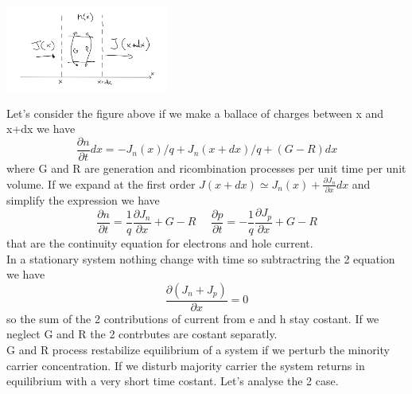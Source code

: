 \centering
\includegraphics[width=0.4\textwidth]{continuityeq.png}\\
\raggedright

Let's consider the figure above if we make a ballace of charges between x and x+dx we have 
\begin{equation}
\frac{\partial n}{\partial t}dx=-J_n(x)/q+J_n(x+dx)/q+(G-R)dx
\end{equation}
where G and R are generation and ricombination processes per unit time per unit volume. If we expand at the first order $J(x+dx)\simeq J_n(x)+\frac{\partial J_n}{\partial x}dx $ and simplify the expression we have
\begin{equation}
\frac{\partial n}{\partial t}=\frac{1}{q}\frac{\partial J_n}{\partial x}+G-R \ \ \ \ \ \ \frac{\partial p}{\partial t}=-\frac{1}{q}\frac{\partial J_p}{\partial x}+G-R
\end{equation}
that are the continuity equation for electrons and hole current.\\
In a stationary system nothing change with time so subtractring the 2 equation we have 
\begin{equation}
\frac{\partial(J_n+J_p)}{\partial x}=0
\end{equation}
so the sum of the 2 contributions of current from e and h stay costant. If we neglect G and R the 2 contrbutes are costant separatly.\\
G and R process restabilize equilibrium of a system if we perturb the minority carrier concentration. If we disturb majority carrier the system returns in equilibrium with a very short time costant.
Let's analyse the 2 case.\\ 

